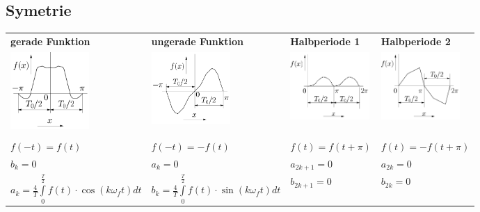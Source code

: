 \subsection{Symetrie}
\begin{tabular}{|p{4.3cm}|p{4.3cm}|p{4.3cm}|p{4.3cm}|}
  \hline
 	\textbf{gerade Funktion} & \textbf{ungerade Funktion} &
 	\textbf{Halbperiode 1} & \textbf{Halbperiode 2}\\
 	\includegraphics[width=3cm]{content/appendix/geradeFunktion.png}&
 	\includegraphics[width=3cm]{content/appendix/ungeradeFunktion.png}&   
  \includegraphics[width=3cm]{content/appendix/halbperiode1.png}&   
  \includegraphics[width=3cm]{content/appendix/halbperiode2.png}\\
	& & & \\			
	$f(-t)=f(t)$ & $f(-t)=-f(t)$ & $f(t)=f(t+\pi)$ & $f(t)=-f(t+\pi)$\\
	$b_k=0$ & $a_k=0$ & $a_{2k+1}=0$ & $a_{2k}=0$\\
	$a_k = \frac{4}{T} \int\limits_0^{\frac{T}{2}} f(t) \cdot \cos(k \omega_f
	t) dt$ &
	$b_k =  \frac{4}{T} \int\limits_0^{\frac{T}{2}} f(t) \cdot
  \sin(k \omega_f t) dt$ &
	$b_{2k+1}=0$ & $b_{2k}=0$\\
	\hline
\end{tabular} 
    
